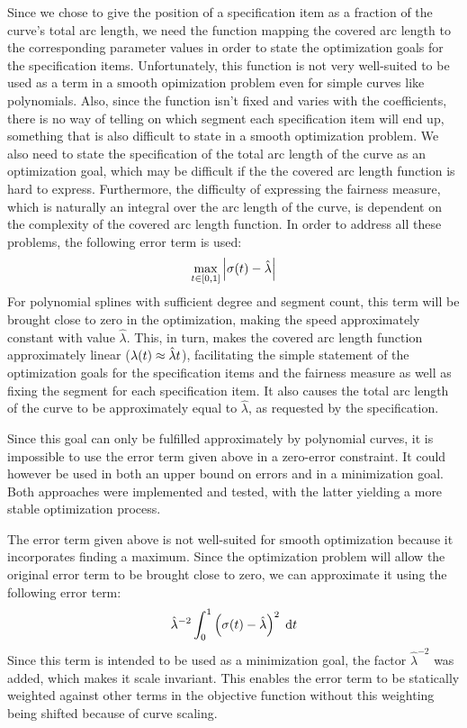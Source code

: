 \documentclass[a4paper]{article}
\begin{document}
				Since we chose to give the position of a specification item as a fraction of the curve's total arc length, we need the function mapping the covered arc length to the corresponding parameter values in order to state the optimization goals for the specification items. Unfortunately, this function is not very well-suited to be used as a term in a smooth opimization problem even for simple curves like polynomials. Also, since the function isn't fixed and varies with the coefficients, there is no way of telling on which segment each specification item will end up, something that is also difficult to state in a smooth optimization problem. We also need to state the specification of the total arc length of the curve as an optimization goal, which may be difficult if the the covered arc length function is hard to express. Furthermore, the difficulty of expressing the fairness measure, which is naturally an integral over the arc length of the curve, is dependent on the complexity of the covered arc length function. In order to address all these problems, the following error term is used:
				\begin{equation*}
					\max_{t \in \left[ 0,1 \right]} \left| \sigma\!\left( t \right) - \hat{\lambda} \right|
				\end{equation*}
				For polynomial splines with sufficient degree and segment count, this term will be brought close to zero in the optimization, making the speed approximately constant with value \(\hat{\lambda}\). This, in turn, makes the covered arc length function approximately linear (\(\lambda\!\left( t \right) \approx \hat{\lambda}t\)), facilitating the simple statement of the optimization goals for the specification items and the fairness measure as well as fixing the segment for each specification item. It also causes the total arc length of the curve to be approximately equal to \(\hat{\lambda}\), as requested by the specification.

				Since this goal can only be fulfilled approximately by polynomial curves, it is impossible to use the error term given above in a zero-error constraint. It could however be used in both an upper bound on errors and in a minimization goal. Both approaches were implemented and tested, with the latter yielding a more stable optimization process.

				The error term given above is not well-suited for smooth optimization because it incorporates finding a maximum. Since the optimization problem will allow the original error term to be brought close to zero, we can approximate it using the following error term:
				\begin{equation*}
					\hat{\lambda}^{-2}\int_{0}^{1} \left( \sigma\!\left( t \right) - \hat{\lambda} \right)^2 \; \mathrm{d}t
				\end{equation*}
				Since this term is intended to be used as a minimization goal, the factor \(\hat{\lambda}^{-2}\) was added, which makes it scale invariant. This enables the error term to be statically weighted against other terms in the objective function without this weighting being shifted because of curve scaling.
\end{document}
